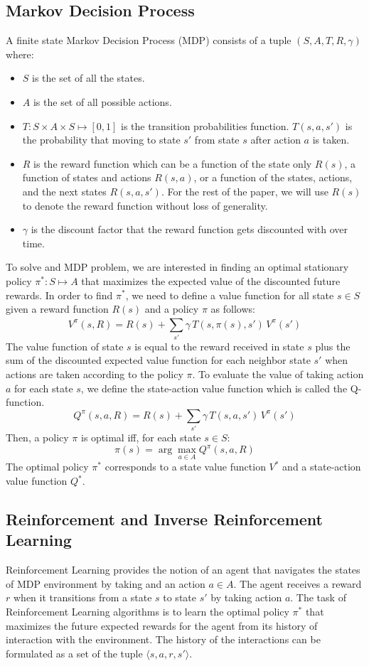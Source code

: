 \documentclass[letterpaper, 10 pt, conference]{ieeeconf}  %
\begin{document}
\subsection{Markov Decision Process}
A finite state Markov Decision Process (MDP) \cite{puterman2014markov} consists of a tuple $(S,A,T,R,\gamma)$ where:
\begin{itemize}
    \item $S$ is the set of all the states.
    \item $A$ is the set of all possible actions.
    \item $T : S\times A\times S \mapsto [0,1]$ is the transition probabilities function. $T(s,a,s')$ is the probability that moving to state $s'$ from state $s$ after action $a$ is taken.
    \item $R$ is the reward function which can be a function of the state only $R(s)$, a function of states and actions $R(s,a)$, or a function of the states, actions, and the next states $R(s,a,s')$. For the rest of the paper, we will use $R(s)$ to denote the reward function without loss of generality.
    \item $\gamma$ is the discount factor that the reward function gets discounted with over time.
\end{itemize}
To solve and MDP problem, we are interested in finding an optimal stationary policy $\pi^*: S \mapsto A$ that maximizes the expected value of the discounted future rewards.
In order to find $\pi^*$, we need to define a value function for all state $s \in S$ given a reward function $R(s)$ and a policy $\pi$ as follows:
\[ V^\pi(s,R) = R(s) + \sum_{s'}^{}\gamma\,T(s,\pi(s),s')\,V^\pi(s') \]
The value function of state $s$ is equal to the reward received in state $s$ plus the sum of the discounted expected value function for each neighbor state $s'$ when actions are taken according to the policy $\pi$.
To evaluate the value of taking action $a$ for each state $s$, we define the state-action value function which is called the Q-function.
\[Q^\pi(s,a,R) = R(s) + \sum_{s'}{} \gamma\,T(s,a,s')\,V^\pi(s') \]
Then, a policy $\pi$ is optimal iff, for each state $s \in S$:
\[ \pi(s) = \arg\!\max_{a\in A} Q^\pi(s,a,R)\]
The optimal policy $\pi^*$ corresponds to a state value function $V^*$ and a state-action value function $Q^*$.

\subsection{Reinforcement and Inverse Reinforcement Learning}
Reinforcement Learning provides the notion of an agent that navigates the states of MDP environment by taking and an action $a \in A$. The agent receives a reward $r$ when it transitions from a state $s$ to state $s'$ by taking action $a$. The task of Reinforcement Learning algorithms is to learn the optimal policy $\pi^*$ that maximizes the future expected rewards for the agent from its history of interaction with the environment. The history of the interactions can be formulated as a set of the tuple $\big \langle s,a,r,s' \big \rangle$.
\end{document}
